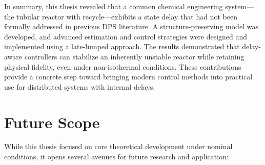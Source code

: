 		In summary, this thesis revealed that a common chemical engineering system—the tubular reactor with recycle—exhibits a state delay that had not been formally addressed in previous DPS literature. A structure-preserving model was developed, and advanced estimation and control strategies were designed and implemented using a late-lumped approach. The results demonstrated that delay-aware controllers can stabilize an inherently unstable reactor while retaining physical fidelity, even under non-isothermal conditions. These contributions provide a concrete step toward bringing modern control methods into practical use for distributed systems with internal delays.

	\section{Future Scope}
		While this thesis focused on core theoretical development under nominal conditions, it opens several avenues for future research and application:
